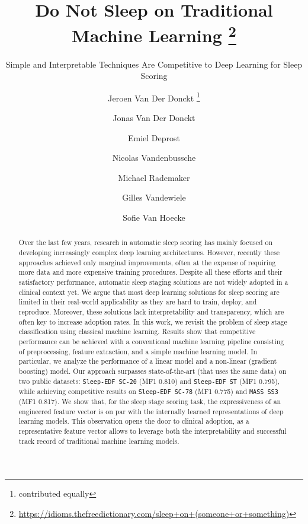 \documentclass[runningheads]{llncs}
\begin{document}
\title{
Do Not Sleep on Traditional Machine Learning 
\thanks{\url{https://idioms.thefreedictionary.com/sleep+on+(someone+or+something)}}
}
\subtitle{Simple and Interpretable Techniques Are Competitive to Deep Learning for Sleep Scoring}
\newcommand*\samethanks[1][\value{footnote}]{\footnotemark[#1]}

\author{
Jeroen Van Der Donckt  \thanks{contributed equally} \and
Jonas Van Der Donckt  \samethanks \and
Emiel Deprost  \and
Nicolas Vandenbussche  \and
Michael Rademaker  \and 
Gilles Vandewiele  \and Sofie Van Hoecke 
}
\maketitle              \begin{abstract}
Over the last few years, research in automatic sleep scoring has mainly focused on developing increasingly complex deep learning architectures. 
However, recently these approaches achieved only marginal improvements, often at the expense of requiring more data and more expensive training procedures.
Despite all these efforts and their satisfactory performance, automatic sleep staging solutions are not widely adopted in a clinical context yet.
We argue that most deep learning solutions for sleep scoring are limited in their real-world applicability as they are hard to train, deploy, and reproduce. Moreover, these solutions lack interpretability and transparency, which are often key to increase adoption rates. 
In this work, we revisit the problem of sleep stage classification using classical machine learning. Results show that competitive performance can be achieved with a conventional machine learning pipeline consisting of preprocessing, feature extraction, and a simple machine learning model. 
In particular, we analyze the performance of a linear model and a non-linear (gradient boosting) model.
Our approach surpasses state-of-the-art (that uses the same data) on two public datasets: \texttt{Sleep-EDF SC-20} (MF1 0.810) and \texttt{Sleep-EDF ST} (MF1 0.795), while achieving competitive results on \texttt{Sleep-EDF SC-78} (MF1 0.775) and \texttt{MASS SS3} (MF1 0.817). We show that, for the sleep stage scoring task, the expressiveness of an engineered feature vector is on par with the internally learned representations of deep learning models.
This observation opens the door to clinical adoption, as a representative feature vector allows to leverage both the interpretability and successful track record of traditional machine learning models.

\end{abstract}
\end{document}
